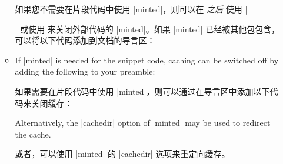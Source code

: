 \begin{itemize}
\begin{itemize}
如果您不需要在片段代码中使用 |minted|，则可以在  \emph{之后} 使用 |\usepackage{minted}| 或使用  来关闭外部代码的 |minted|。如果 |minted| 已经被其他包包含，可以将以下代码添加到文档的导言区：
\begin{dispListing}
\end{dispListing}
\item If |minted| is needed for the snippet code, caching can be switched
off by adding the following to your preamble:

如果需要在片段代码中使用 |minted|，则可以通过在导言区中添加以下代码来关闭缓存：
\begin{dispListing}
\end{dispListing}
Alternatively, the |cachedir| option of |minted| may be used to redirect
the cache.

或者，可以使用 |minted| 的 |cachedir| 选项来重定向缓存。
\end{itemize}

\end{itemize}

